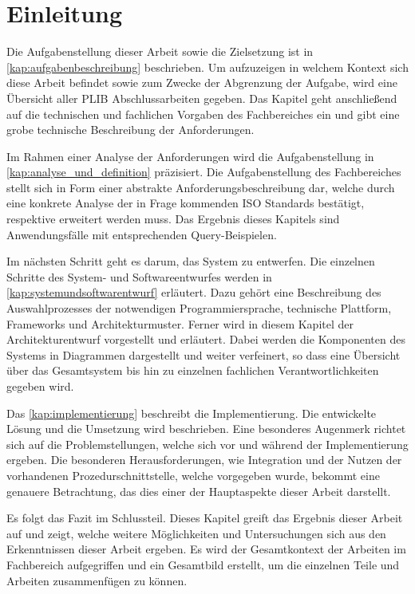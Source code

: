 
\chapter{Einleitung}\label{sec:einleitung}

Die Aufgabenstellung dieser Arbeit sowie die Zielsetzung ist in \autoref{kap:aufgabenbeschreibung} beschrieben. Um aufzuzeigen in welchem Kontext sich diese Arbeit befindet sowie zum Zwecke der Abgrenzung der Aufgabe, wird eine Übersicht aller PLIB Abschlussarbeiten gegeben. Das Kapitel geht anschließend auf die technischen und fachlichen Vorgaben des Fachbereiches ein und gibt eine grobe technische Beschreibung der Anforderungen.

Im Rahmen einer Analyse der Anforderungen wird die Aufgabenstellung in \autoref{kap:analyse_und_definition} präzisiert. Die Aufgabenstellung des Fachbereiches stellt sich in Form einer abstrakte Anforderungsbeschreibung dar, welche durch eine konkrete Analyse der in Frage kommenden ISO Standards bestätigt, respektive erweitert werden muss. Das Ergebnis dieses Kapitels sind Anwendungsfälle mit entsprechenden Query-Beispielen. 

Im nächsten Schritt geht es darum, das System zu entwerfen. Die einzelnen Schritte des System- und Softwareentwurfes werden in \autoref{kap:systemundsoftwarentwurf} erläutert. Dazu gehört eine Beschreibung des Auswahlprozesses der notwendigen Programmiersprache, technische Plattform, Frameworks und Architekturmuster. 
Ferner wird in diesem Kapitel der Architekturentwurf vorgestellt und erläutert. Dabei werden die Komponenten des Systems in Diagrammen dargestellt und weiter verfeinert, so dass eine Übersicht über das Gesamtsystem bis hin zu einzelnen fachlichen Verantwortlichkeiten gegeben wird. 

Das \autoref{kap:implementierung} beschreibt die Implementierung. Die entwickelte Lösung und die Umsetzung wird beschrieben. Eine besonderes Augenmerk richtet sich auf die Problemstellungen, welche sich vor und während der Implementierung ergeben. Die besonderen Herausforderungen, wie Integration und der Nutzen der vorhandenen Prozedurschnittstelle, welche vorgegeben wurde, bekommt eine genauere Betrachtung, das dies einer der Hauptaspekte dieser Arbeit darstellt.

Es folgt das Fazit im Schlussteil. Dieses Kapitel greift das Ergebnis dieser Arbeit auf und zeigt, welche weitere Möglichkeiten und Untersuchungen sich aus den Erkenntnissen dieser Arbeit ergeben. Es wird der Gesamtkontext der Arbeiten im Fachbereich aufgegriffen und ein Gesamtbild erstellt, um die einzelnen Teile und Arbeiten zusammenfügen zu können. 